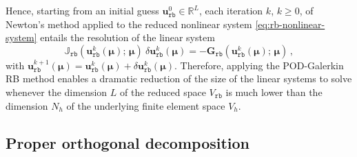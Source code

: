 \documentclass{elsarticle}
\numberwithin{equation}{section}
\theoremstyle{theorem}
\theoremstyle{definition}
\theoremstyle{remark}
\theoremstyle{proposition}
\numberwithin{figure}{section}
\newcommand{\bg}[1]{\boldsymbol{#1}}
\begin{document}
		Hence, starting from an initial guess $\mathbf{u}_{\texttt{rb}}^0 \in \mathbb{R}^L$, each iteration $k$, $k \geq 0$, of Newton's method applied to the reduced nonlinear system \eqref{eq:rb-nonlinear-system} entails the resolution of the linear system
		\begin{equation}
			\label{eq:rb-nonlinear-system-newton}
			\mathbb{J}_{\texttt{rb}}(\mathbf{u}_{\texttt{rb}}^k(\bg{\mu}); \, \bg{\mu}) ~ \delta \mathbf{u}_{\texttt{rb}}^k(\bg{\mu}) = - \mathbf{G}_{\texttt{rb}}(\mathbf{u}_{\texttt{rb}}^k(\bg{\mu}); \, \bg{\mu}) \, ,
		\end{equation}
		with $\mathbf{u}_{\texttt{rb}}^{k+1}(\bg{\mu}) = \mathbf{u}_{\texttt{rb}}^k(\bg{\mu}) + \delta \mathbf{u}_{\texttt{rb}}^k(\bg{\mu})$. Therefore, applying the POD-Galerkin RB method enables a dramatic reduction of the size of the linear systems to solve whenever the dimension $L$ of the reduced space $V_{\texttt{rb}}$ is much lower than the dimension ${N_h}$ of the underlying finite element space $V_h$. 
		
		
	
		
	\subsection{Proper orthogonal decomposition}
	\label{section:Proper Orthogonal Decomposition} 
		
		
\end{document}
